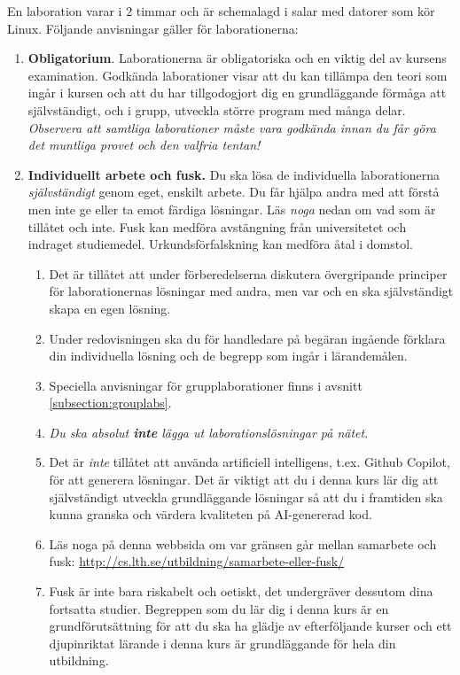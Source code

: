 En laboration varar i  $2$ timmar och är schemalagd i salar med datorer som kör Linux. Följande anvisningar gäller för laborationerna:

\begin{enumerate}

\item \textbf{Obligatorium}. Laborationerna är obligatoriska och en viktig del av kursens examination. Godkända laborationer visar att du kan tillämpa den teori som ingår i kursen och att du har tillgodogjort dig en grundläggande förmåga att självständigt, och i grupp, utveckla större program med många delar.  \emph{Observera att samtliga laborationer måste vara godkända innan du får göra det muntliga provet och den valfria tentan!}

\item  \textbf{Individuellt arbete och fusk.} Du ska lösa de individuella laborationerna \emph{självständigt} genom eget, enskilt arbete. Du får hjälpa andra med att förstå men inte ge eller ta emot färdiga lösningar. Läs \emph{noga} nedan om vad som är tillåtet och inte. Fusk kan medföra avstängning från universitetet och indraget studiemedel. Urkundsförfalskning kan medföra åtal i domstol. 
\begin{enumerate}
  \item  Det är tillåtet att under förberedelserna diskutera övergripande principer för laborationernas lösningar med andra, men var och en ska självständigt skapa en egen lösning. 
  \item Under redovisningen ska du för handledare på begäran ingående förklara din individuella lösning och de begrepp som ingår i lärandemålen. 
  \item Speciella anvisningar för grupplaborationer finns i avsnitt \ref{subsection:grouplabs}.
  \item \emph{Du ska absolut \textbf{inte} lägga ut laborationslösningar på nätet}.
  \item Det är \emph{inte} tillåtet att använda artificiell intelligens, t.ex. Github Copilot, för att generera lösningar. Det är viktigt att du i denna kurs lär dig att självständigt utveckla grundläggande lösningar så att du i framtiden ska kunna granska och värdera kvaliteten på AI-genererad kod. 
  \item Läs noga på denna webbsida om var gränsen går mellan samarbete och fusk: \url{http://cs.lth.se/utbildning/samarbete-eller-fusk/}
  \item Fusk är inte bara riskabelt och oetiskt, det undergräver dessutom dina fortsatta studier. Begreppen som du lär dig i denna kurs är en grundförutsättning för att du ska ha glädje av efterföljande kurser och ett djupinriktat lärande i denna kurs är grundläggande för hela din utbildning.
\end{enumerate}


\end{enumerate}
